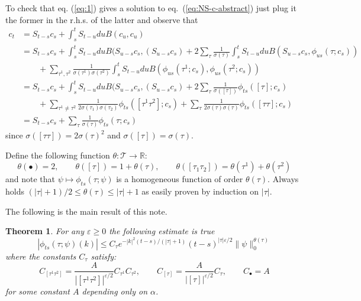 \documentclass[a4paper,12pt,reqno]{amsart}
\newcommand{\1}{{\bf 1}}
\newcommand{\eps}{\varepsilon}
\newcommand{\RR}{\mathbb{R}}
\newtheorem{theorem}{Theorem}[section]
\newcommand{\TT}{\mathcal{T}}
\newcommand{\troot}{\bullet}
\begin{document}
To check that eq. (\ref{eq:1}) gives a solution to
eq.~(\ref{eq:NS-c-abstract}) just plug it the former in the r.h.s. of
the latter  and observe that
\begin{equation*}
  \begin{split}
c_t & = S_{t-s} c_s +  \int_s^t S_{t-u} du B(c_u,c_u)
  \\ & = S_{t-s} c_s + \int_s^t S_{t-u} du B(S_{u-s}c_s,(S_{u-s}c_s) +  2
  \sum_\tau \frac{1}{\sigma(\tau)}\int_s^t S_{t-u} du B(S_{u-s} c_s,\phi_{us}(\tau;c_s)) 
\\ & \qquad +
  \sum_{\tau^1,\tau^2}  \frac{1}{\sigma(\tau^1)\sigma(\tau^2)} \int_s^t S_{t-u} du B(\phi_{us}(\tau^1;c_s),\phi_{us}(\tau^2;c_s))
  \\ & = S_{t-s} c_s + \int_s^t S_{t-u} du B(S_{u-s}c_s,(S_{u-s}c_s) +  2
  \sum_\tau \frac{1}{\sigma([\tau])} \phi_{ts}([\tau];c_s)
\\ & \qquad +
  \sum_{\tau^1 \neq \tau^2} \frac{1}{2 \sigma(\tau_1) \sigma(\tau_2)}
  \phi_{ts}([\tau^1 \tau^2];c_s)
 +
  \sum_{\tau } \frac{1}{2 \sigma(\tau) \sigma(\tau)}
  \phi_{ts}([\tau \tau];c_s)
  \\ & = S_{t-s} c_s + \sum_\tau \frac{1}{\sigma(\tau)} \phi_{ts}(\tau;c_s)
  \end{split}
\end{equation*}
since $\sigma([\tau \tau]) = 2 \sigma(\tau)^2$ and $\sigma([\tau]) =
\sigma(\tau)$. 

\bigskip

Define the following function $\theta : \TT \to \RR$:
\begin{equation*}
\theta(\troot) = 2, \qquad \theta([\tau]) = 1+ \theta(\tau), \qquad
\theta([\tau_1 \tau_2]) = \theta(\tau^1) + \theta(\tau^2)  
\end{equation*}
and note that $\psi \mapsto \phi_{ts}(\tau; \psi)$ is a homogeneous
function of order $\theta(\tau)$. Always holds $(|\tau|+1)/2 \le
\theta(\tau) \le
|\tau|+1$ as easily proven by induction on $|\tau|$.

\bigskip
The following is the main result of this note.

\begin{theorem}
\label{th:main}
For any $\eps \ge 0$ the following estimate is true
\begin{equation*}
|\phi_{ts}(\tau;\psi)(k)| \le C_{\tau} e^{-|k|^2 (t-s) / (|\tau|+1)}
(t-s)^{|\tau| \eps /2} \|\psi\|_0^{\theta(\tau)}  
\end{equation*}
where the constants $C_{\tau}$ satisfy:
$$
C_{[\tau^1 \tau^2]} = \frac{A}{|[\tau^1 \tau^2]|^{\eps/2}} C_{\tau^1} C_{\tau^2}, \qquad C_{[\tau]} = \frac{A}{|[\tau]|^{\eps/2}}
C_{\tau}, \qquad C_{\troot} = A
$$
for some constant $A$ depending only on $\alpha$. 
  
\end{theorem}
\end{document}

